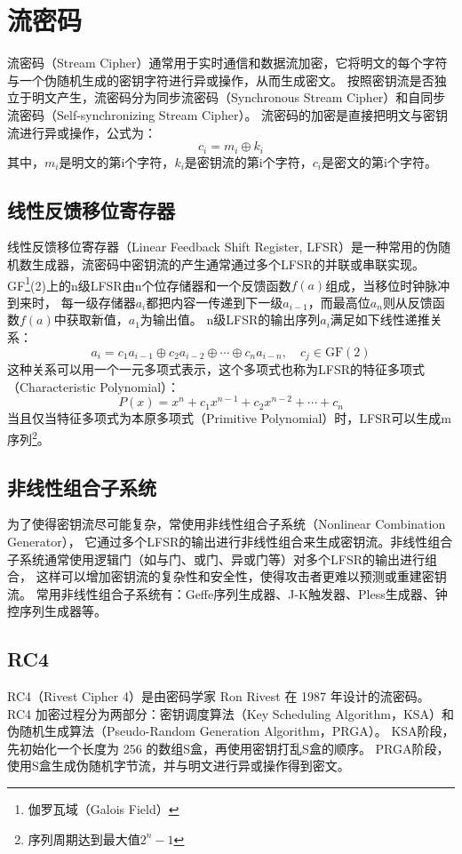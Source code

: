 \section{流密码}
流密码（Stream Cipher）通常用于实时通信和数据流加密，它将明文的每个字符与一个伪随机生成的密钥字符进行异或操作，从而生成密文。
按照密钥流是否独立于明文产生，流密码分为同步流密码（Synchronous Stream Cipher）和自同步流密码（Self-synchronizing Stream Cipher）。
流密码的加密是直接把明文与密钥流进行异或操作，公式为：
$$c_i = m_i \oplus k_i$$
其中，$m_i$是明文的第i个字符，$k_i$是密钥流的第i个字符，$c_i$是密文的第i个字符。

\subsection{线性反馈移位寄存器}
线性反馈移位寄存器（Linear Feedback Shift Register, LFSR）是一种常用的伪随机数生成器，流密码中密钥流的产生通常通过多个LFSR的并联或串联实现。
GF\footnote{伽罗瓦域（Galois Field）}(2)上的n级LFSR由n个位存储器和一个反馈函数$f(a)$组成，当移位时钟脉冲到来时，
每一级存储器$a_i$都把内容一传递到下一级$a_{i-1}$，而最高位$a_n$则从反馈函数$f(a)$中获取新值，$a_1$为输出值。
n级LFSR的输出序列$a_i$满足如下线性递推关系：
$$
a_i = c_1 a_{i-1} \oplus c_2 a_{i-2} \oplus \cdots \oplus c_n a_{i-n}, \quad c_j \in \mathrm{GF}(2)
$$
这种关系可以用一个一元多项式表示，这个多项式也称为LFSR的特征多项式（Characteristic Polynomial）：
$$
P(x) = x^n + c_1 x^{n-1} + c_2 x^{n-2} + \cdots + c_n
$$
当且仅当特征多项式为本原多项式（Primitive Polynomial）时，LFSR可以生成m序列\footnote{序列周期达到最大值$2^n - 1$}。

\subsection{非线性组合子系统}
为了使得密钥流尽可能复杂，常使用非线性组合子系统（Nonlinear Combination Generator），
它通过多个LFSR的输出进行非线性组合来生成密钥流。非线性组合子系统通常使用逻辑门（如与门、或门、异或门等）对多个LFSR的输出进行组合，
这样可以增加密钥流的复杂性和安全性，使得攻击者更难以预测或重建密钥流。
常用非线性组合子系统有：Geffe序列生成器、J-K触发器、Pless生成器、钟控序列生成器等。

\subsection{RC4}
RC4（Rivest Cipher 4）是由密码学家 Ron Rivest 在 1987 年设计的流密码。
RC4 加密过程分为两部分：密钥调度算法（Key Scheduling Algorithm，KSA）和伪随机生成算法（Pseudo-Random Generation Algorithm，PRGA）。
KSA阶段，先初始化一个长度为 256 的数组S盒，再使用密钥打乱S盒的顺序。
PRGA阶段，使用S盒生成伪随机字节流，并与明文进行异或操作得到密文。

